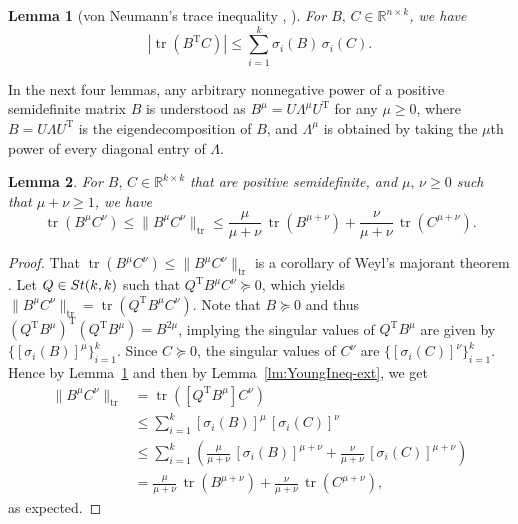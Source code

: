 \documentclass[11pt]{article}
\def\bbR{\mathbb{R}}
\newcommand\STM[2]{{\rm St}(#1,#2)}
\DeclareMathOperator{\tr}{tr}
\DeclareMathOperator{\T}{T}
\newtheorem{lemma}{Lemma}[section]
\theoremstyle{definition}
\numberwithin{equation}{section}
\begin{document}
\begin{lemma}[von Neumann's trace inequality \cite{neum:1937}, {\cite[p.183]{hojo:1991}}]\label{lm:vN-tr-ineq}
For $B,\,C\in\bbR^{n\times k}$, we have
$$
|\tr(B^{\T}C)|\le\sum_{i=1}^k\sigma_i(B)\,\sigma_i(C).
$$
\end{lemma}



In the next four lemmas, any arbitrary nonnegative power of a positive semidefinite matrix $B$ is understood as
$B^{\mu}=U\Lambda^{\mu} U^{\T}$ for any $\mu\ge 0$, where $B=U\Lambda U^{\T}$ is the eigendecomposition of $B$,
and $\Lambda^{\mu}$ is obtained by taking the $\mu$th power of every diagonal entry of $\Lambda$.

\begin{lemma}\label{lm:vN-tr-ineq-ext}
For $B,\,C\in\bbR^{k\times k}$ that are positive semidefinite, and $\mu,\,\nu\ge 0$ such that $\mu+\nu\ge 1$,  we have
$$
\tr(B^{\mu}C^{\nu})\le\|B^{\mu}C^{\nu}\|_{\tr}\le\frac {\mu}{\mu+\nu}\, \tr(B^{\mu+\nu})+\frac {\nu}{\mu+\nu}\, \tr(C^{\mu+\nu}).
$$
\end{lemma}

\begin{proof}
That $\tr(B^{\mu}C^{\nu})\le\|B^{\mu}C^{\nu}\|_{\tr}$ is a corollary of Weyl's majorant theorem \cite[p.42]{bhat:1996}.
Let $Q\in\STM{k}{k}$ such that $Q^{\T}B^{\mu}C^{\nu}\succeq 0$, which yields
$\|B^{\mu}C^{\nu}\|_{\tr}=\tr(Q^{\T}B^{\mu}C^{\nu})$. Note that $B\succeq 0$ and thus
$(Q^{\T}B^{\mu})^{\T}(Q^{\T}B^{\mu})=B^{2\mu}$, implying the singular values of $Q^{\T}B^{\mu}$ are given by $\{[\sigma_i(B)]^{\mu}\}_{i=1}^k$.
Since $C\succeq 0$, the singular values of $C^{\nu}$ are $\{[\sigma_i(C)]^{\nu}\}_{i=1}^k$. Hence by Lemma~\ref{lm:vN-tr-ineq} and then by Lemma~\ref{lm:YoungIneq-ext},
we get
\begin{align}
\|B^{\mu}C^{\nu}\|_{\tr}&=\tr([Q^{\T}B^{\mu}]C^{\nu}) \label{eq:vN-tr-ineq-ext-pf-0}\\
  &\le \sum_{i=1}^k[\sigma_i(B)]^{\mu}\,[\sigma_i(C)]^{\nu} \nonumber\\
  &\le \sum_{i=1}^k \left(\frac {\mu}{\mu+\nu}\, [\sigma_i(B)]^{\mu+\nu}+\frac {\nu}{\mu+\nu}\, [\sigma_i(C)]^{\mu+\nu}\right)
   \label{eq:vN-tr-ineq-ext-pf-1}\\
  &=\frac {\mu}{\mu+\nu}\, \tr(B^{\mu+\nu})+\frac {\nu}{\mu+\nu}\, \tr(C^{\mu+\nu}), \nonumber
\end{align}
as expected.
\end{proof}
\end{document}

